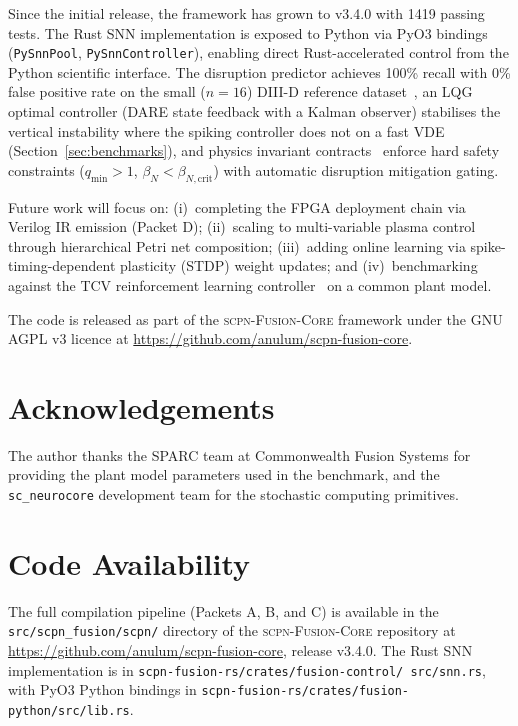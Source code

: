 \documentclass[12pt]{article}
\newcommand{\code}[1]{\texttt{#1}}
\newcommand{\scpn}{\textsc{scpn-Fusion-Core}}
\begin{document}
Since the initial release, the framework has grown to v3.4.0 with
1419 passing tests.  The Rust SNN implementation is exposed to Python
via PyO3 bindings (\code{PySnnPool}, \code{PySnnController}), enabling
direct Rust-accelerated control from the Python scientific interface.
The disruption predictor achieves 100\% recall with 0\% false positive
rate on the small ($n = 16$) DIII-D reference
dataset~\citep{Kates-Harbeck2019}, an LQG optimal controller (DARE state
feedback with a Kalman observer) stabilises the vertical instability where
the spiking controller does not on a fast VDE
(Section~\ref{sec:benchmarks}), and physics invariant
contracts~\citep{Boozer2015} enforce hard safety constraints
($q_{\min} > 1$, $\beta_N < \beta_{N,\mathrm{crit}}$) with
automatic disruption mitigation gating.

Future work will focus on: (i)~completing the FPGA deployment chain
via Verilog IR emission (Packet D); (ii)~scaling to multi-variable
plasma control through hierarchical Petri net composition;
(iii)~adding online learning via spike-timing-dependent plasticity
(STDP) weight updates; and (iv)~benchmarking against the TCV
reinforcement learning controller~\citep{Degrave2022} on a common
plant model.

The code is released as part of the \scpn{} framework under the GNU
AGPL v3 licence at
\url{https://github.com/anulum/scpn-fusion-core}.


\section*{Acknowledgements}

The author thanks the SPARC team at Commonwealth Fusion Systems for
providing the plant model parameters used in the benchmark, and the
\code{sc\_neurocore} development team for the stochastic computing
primitives.

\section*{Code Availability}

The full compilation pipeline (Packets A, B, and C) is available in the
\code{src/scpn\_fusion/scpn/} directory of the \scpn{} repository at
\url{https://github.com/anulum/scpn-fusion-core}, release v3.4.0.  The
Rust SNN implementation is in \code{scpn-fusion-rs/crates/fusion-control/
src/snn.rs}, with PyO3 Python bindings in
\code{scpn-fusion-rs/crates/fusion-python/src/lib.rs}.


\end{document}
